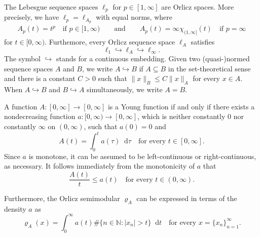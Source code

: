 \documentclass[nointlimits]{amsart}
\numberwithin{equation}{section}
\theoremstyle{plain}
\theoremstyle{definition}
\newcommand{\N}{\mathbb{N}}
\newcommand{\lA}{\ell_A}
\newcommand{\rA}{\varrho_A}
\newcommand*\dd{\mathop{}\!\mathrm{d}}
\begin{document}
The Lebesgue sequence spaces $\ell_p$ for $p\in[1, \infty]$ are Orlicz spaces. More precisely, we have $\ell_p = \ell_{A_p}$ with equal norms, where
\begin{align*}
    A_p(t) = t^{p} \quad \text{if $p\in[1, \infty)$} \qquad \text{and} \qquad A_p(t) = \infty\chi_{(1, \infty]}(t) \quad \text{if $p=\infty$}
\end{align*}
for $t\in[0, \infty)$. Furthemore, every Orlicz sequence space $\lA$ satisfies
\begin{equation*}
    \ell_1 \hookrightarrow \lA \hookrightarrow \ell_\infty.
\end{equation*}
The symbol $\hookrightarrow$ stands for a continuous embedding. Given two (quasi-)normed sequence spaces $A$ and $B$, we write $A\hookrightarrow B$ if $A\subseteq B$ in the set-theoretical sense and there is a constant $C>0$ such that $\|x\|_B \leq C \|x\|_A$ for every $x \in A$. When $A\hookrightarrow B$ and $B\hookrightarrow A$ simultaneously, we write $A = B$.

A function $A\colon[0, \infty] \to[0, \infty]$ is a Young function if and only if there exists a nondecreasing function $a\colon[0,\infty)\to[0,\infty]$, which is neither constantly $0$ nor constantly $\infty$ on $(0,\infty)$, such that $a(0) = 0$ and
\begin{equation} \label{prel:orlicz-integral-representation-of-young-function}
	A(t)=\int_0^t a(\tau) \dd\tau
		\quad\text{for every $t\in[0, \infty]$}.
\end{equation}
Since $a$ is monotone, it can be assumed to be left-continuous or right-continuous, as necessary. It follows immediately from the monotonicity of $a$ that
\begin{equation}
\label{E:relation-between-a-and-A}
    \frac{A(t)}{t} \le a(t) \quad \text{for every $t \in(0,\infty)$.}
\end{equation}

Furthermore, the Orlicz semimodular $\rA$ can be expressed in terms of the density $a$ as
\begin{equation}\label{prel:Orlicz_mnodular_via_distribution}
    \rA(x) = \int_0^\infty a(t) \#\{n\in\N: |x_n| > t \} \dd t \quad \text{for every $x=\{x_n\}_{n=1}^\infty$}.
\end{equation}
\end{document}
